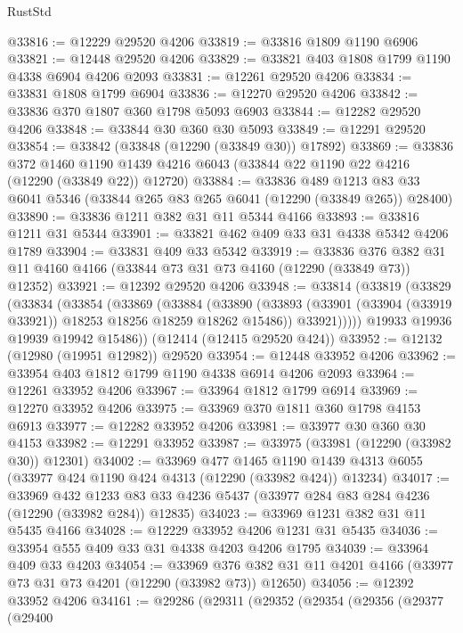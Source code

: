 \begin{lexlean}{RustStd}
\begin{coremodule}
{\begin{coremodule}
{{{{{{{{{{{{{{{{{{{{{{{{{{{{{{{{{{{{{{{{{{{{{{{{{{@33816 := @12229 @29520 @4206
@33819 := @33816 @1809 @1190 @6906
@33821 := @12448 @29520 @4206
@33829 := @33821 @403 @1808 @1799 @1190 @4338 @6904 @4206 @2093
@33831 := @12261 @29520 @4206
@33834 := @33831 @1808 @1799 @6904
@33836 := @12270 @29520 @4206
@33842 := @33836 @370 @1807 @360 @1798 @5093 @6903
@33844 := @12282 @29520 @4206
@33848 := @33844 @30 @360 @30 @5093
@33849 := @12291 @29520
@33854 := @33842 (@33848 (@12290 (@33849 @30)) @17892)
@33869 := @33836
    @372
    @1460
    @1190
    @1439
    @4216
    @6043
    (@33844 @22 @1190 @22 @4216 (@12290 (@33849 @22)) @12720)
@33884 := @33836
    @489
    @1213
    @83
    @33
    @6041
    @5346
    (@33844 @265 @83 @265 @6041 (@12290 (@33849 @265)) @28400)
@33890 := @33836 @1211 @382 @31 @11 @5344 @4166
@33893 := @33816 @1211 @31 @5344
@33901 := @33821 @462 @409 @33 @31 @4338 @5342 @4206 @1789
@33904 := @33831 @409 @33 @5342
@33919 := @33836
    @376
    @382
    @31
    @11
    @4160
    @4166
    (@33844 @73 @31 @73 @4160 (@12290 (@33849 @73)) @12352)
@33921 := @12392 @29520 @4206
@33948 := @33814
    (@33819
      (@33829
        (@33834
          (@33854
            (@33869
              (@33884
                (@33890
                  (@33893 (@33901 (@33904 (@33919 @33921)) @18253 @18256 @18259 @18262 @15486))
                  @33921)))))
        @19933
        @19936
        @19939
        @19942
        @15486))
    (@12414 (@12415 @29520 @424))
@33952 := @12132 (@12980 (@19951 @12982)) @29520
@33954 := @12448 @33952 @4206
@33962 := @33954 @403 @1812 @1799 @1190 @4338 @6914 @4206 @2093
@33964 := @12261 @33952 @4206
@33967 := @33964 @1812 @1799 @6914
@33969 := @12270 @33952 @4206
@33975 := @33969 @370 @1811 @360 @1798 @4153 @6913
@33977 := @12282 @33952 @4206
@33981 := @33977 @30 @360 @30 @4153
@33982 := @12291 @33952
@33987 := @33975 (@33981 (@12290 (@33982 @30)) @12301)
@34002 := @33969
    @477
    @1465
    @1190
    @1439
    @4313
    @6055
    (@33977 @424 @1190 @424 @4313 (@12290 (@33982 @424)) @13234)
@34017 := @33969
    @432
    @1233
    @83
    @33
    @4236
    @5437
    (@33977 @284 @83 @284 @4236 (@12290 (@33982 @284)) @12835)
@34023 := @33969 @1231 @382 @31 @11 @5435 @4166
@34028 := @12229 @33952 @4206 @1231 @31 @5435
@34036 := @33954 @555 @409 @33 @31 @4338 @4203 @4206 @1795
@34039 := @33964 @409 @33 @4203
@34054 := @33969
    @376
    @382
    @31
    @11
    @4201
    @4166
    (@33977 @73 @31 @73 @4201 (@12290 (@33982 @73)) @12650)
@34056 := @12392 @33952 @4206
@34161 := @29286
    (@29311
      (@29352
        (@29354
          (@29356
            (@29377
              (@29400
}}}}}}}}}}}}}}}}}}}}}}}}}}}}}}}}}}}}}}}}}}}}}}}}}}
\end{coremodule}}
\end{coremodule}
\end{lexlean}
